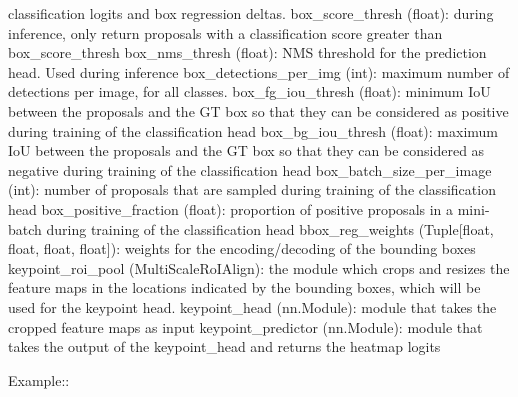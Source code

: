 \begin{DoxyVerb}
        classification logits and box regression deltas.
    box_score_thresh (float): during inference, only return proposals with a classification score
        greater than box_score_thresh
    box_nms_thresh (float): NMS threshold for the prediction head. Used during inference
    box_detections_per_img (int): maximum number of detections per image, for all classes.
    box_fg_iou_thresh (float): minimum IoU between the proposals and the GT box so that they can be
        considered as positive during training of the classification head
    box_bg_iou_thresh (float): maximum IoU between the proposals and the GT box so that they can be
        considered as negative during training of the classification head
    box_batch_size_per_image (int): number of proposals that are sampled during training of the
        classification head
    box_positive_fraction (float): proportion of positive proposals in a mini-batch during training
        of the classification head
    bbox_reg_weights (Tuple[float, float, float, float]): weights for the encoding/decoding of the
        bounding boxes
    keypoint_roi_pool (MultiScaleRoIAlign): the module which crops and resizes the feature maps in
         the locations indicated by the bounding boxes, which will be used for the keypoint head.
    keypoint_head (nn.Module): module that takes the cropped feature maps as input
    keypoint_predictor (nn.Module): module that takes the output of the keypoint_head and returns the
        heatmap logits

Example::


\end{DoxyVerb}
